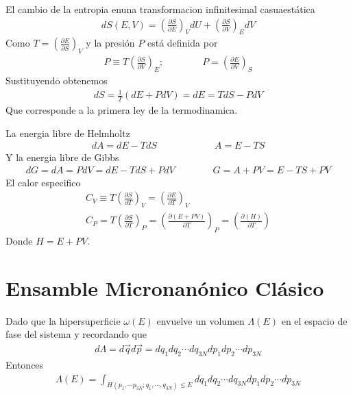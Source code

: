 \documentclass{article}
\begin{document}
El cambio de la entropia enuna transformacion infinitesimal casuaestática 
\begin{gather*}
  dS(E,V ) = \left(\frac{\partial S  }{\partial E }\right)_V dU + \left(\frac{\partial S  }{\partial V }\right)_E dV 
\end{gather*}
Como $ T = \left(\frac{\partial E }{\partial S}\right)_V  $ y la presión $ P  $ está definida por 
\begin{gather*}
  P \equiv T \left(\frac{\partial S }{\partial V}\right)_E; \qquad \qquad P = \left(\frac{\partial E }{\partial V}\right)_S 
\end{gather*}
Sustituyendo obtenemos 
\begin{gather*}
  dS = \frac{1}{T}(dE + P dV) = dE = TdS - PdV 
\end{gather*}
Que corresponde a la primera ley de la termodinamica.

\hfill 

\hfill 

La energia libre de Helmholtz 
\begin{gather*}
  dA = dE - T dS \qquad \qquad \qquad A = E -TS 
\end{gather*}
Y la energia libre de Gibbs 
\begin{gather*}
  dG = dA = PdV = dE - T dS + P dV \qquad \qquad G = A +PV = E - TS + PV 
\end{gather*}
El calor especifico 
\begin{gather*}
  C_V \equiv T \left(\frac{\partial S  }{\partial T }\right)_V = \left(\frac{\partial E  }{\partial T }\right)_V   \\
  C_P = T \left(\frac{\partial S  }{\partial T }\right)_P = \left(\frac{\partial (E + PV ) }{\partial T }\right)_P = \left(\frac{\partial (H)  }{\partial T}\right)
\end{gather*}
Donde $ H = E + PV  $.

\section{Ensamble Micronanónico Clásico }
Dado que la hipersuperficie $ \omega(E) $ envuelve un volumen $ \Lambda(E) $ en el espacio de fase del sistema y recordando que 
\begin{gather*}
  d\Lambda = d\vec q d\vec p = dq_1dq_2 \cdots dq _{3N } dp_1 dp_2 \cdots dp _{3N}  
\end{gather*}
Entonces 
\begin{gather*}
  \Lambda(E) = \int_{H(p_1, \cdots p _{3N } ; q_1, \cdots, q _{3N } )\leq E }^{}  dq_1dq_2 \cdots dq _{3N } dp_1 dp_2 \cdots dp _{3N}
\end{gather*}
\end{document}
